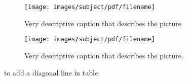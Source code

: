 % 
%
%
%

\begin{figure}[H]
    \centering
    \texttt{[image: images/subject/pdf/filename]}
    \caption{Very descriptive caption that describes the picture}
    \label{fig:unique_figure_label}
\end{figure}


\begin{figure}[H]
    \centering
    \texttt{[image: images/subject/pdf/filename]}
    \caption{Very descriptive caption that describes the picture.}
    \label{fig:PLEASE_FIX_ME}
\end{figure}


to add a diagonal line in table
